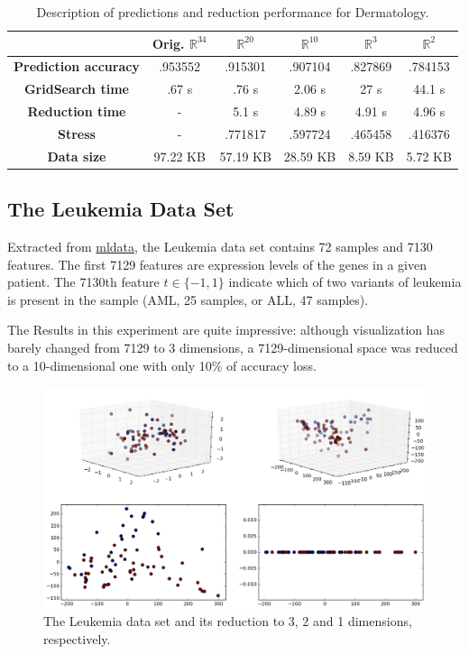 \documentclass[12pt]{report}
\begin{document}
\begin{table}[H]
	\centering
	\begin{tabular}{|c|c|c|c|c|c|}
		\hline
		& \textbf{Orig. $\mathbb{R}^{34}$} & \textbf{$\mathbb{R}^{20}$} & \textbf{$\mathbb{R}^{10}$} & \textbf{$\mathbb{R}^3$} & \textbf{$\mathbb{R}^2$} \\\hline
		\textbf{Prediction accuracy}  & .953552 & .915301 & .907104 & .827869 & .784153 \\\hline
		\textbf{GridSearch time} & .67 s & .76 s & 2.06 s & 27 s & 44.1 s  \\\hline
		\textbf{Reduction time}  & -         & 5.1 s & 4.89 s & 4.91 s & 4.96 s    \\\hline
		\textbf{Stress} & - & .771817 & .597724 & .465458 & .416376 \\\hline
		\textbf{Data size}          & 97.22 KB & 57.19 KB & 28.59 KB  & 8.59 KB & 5.72 KB  \\\hline
	\end{tabular}

	\caption{Description of predictions and reduction performance for Dermatology.}
\end{table}

\newpage
\subsection{The Leukemia Data Set}

Extracted from \href{http://mldata.com}{mldata}, the Leukemia data set contains 72 samples and 7130 features. The first 7129 features are expression levels of the genes in a given patient. The 7130th feature $t \in \{-1, 1\}$ indicate which of two variants of leukemia is present in the sample (AML, 25 samples, or ALL, 47 samples). \cite{on:duc_ds}

The Results in this experiment are quite impressive: although visualization has barely changed from 7129 to 3 dimensions, a 7129-dimensional space was reduced to a 10-dimensional one with only 10\% of accuracy loss.

\begin{figure}[H]
	\centering
	\includegraphics[width=.9\linewidth]{img/experiments/iso_leukemia}
	\captionsetup{justification=centering}
	\caption{The Leukemia data set and its reduction to 3, 2 and 1 dimensions, respectively.}
	\label{fig:leukemiads}
\end{figure}
\end{document}
